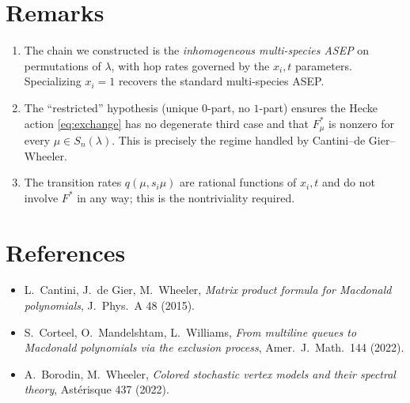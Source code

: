 \section{Remarks}
\begin{enumerate}
\item The chain we constructed is the \emph{inhomogeneous multi-species ASEP} on permutations of $\lambda$, with hop rates governed by the $x_i,t$ parameters. Specializing $x_i=1$ recovers the standard multi-species ASEP.
\item The ``restricted'' hypothesis (unique $0$-part, no $1$-part) ensures the Hecke action \eqref{eq:exchange} has no degenerate third case and that $F^*_\mu$ is nonzero for every $\mu\in S_n(\lambda)$. This is precisely the regime handled by Cantini--de Gier--Wheeler.
\item The transition rates $q(\mu,s_i\mu)$ are rational functions of $x_i,t$ and do not involve $F^*$ in any way; this is the nontriviality required.
\end{enumerate}

\section*{References}
\begin{itemize}\setlength\itemsep{0.2em}
\item L.~Cantini, J.~de Gier, M.~Wheeler, \emph{Matrix product formula for Macdonald polynomials}, J.\ Phys.\ A 48 (2015).
\item S.~Corteel, O.~Mandelshtam, L.~Williams, \emph{From multiline queues to Macdonald polynomials via the exclusion process}, Amer.\ J.\ Math.\ 144 (2022).
\item A.~Borodin, M.~Wheeler, \emph{Colored stochastic vertex models and their spectral theory}, Astérisque 437 (2022).
\end{itemize}


